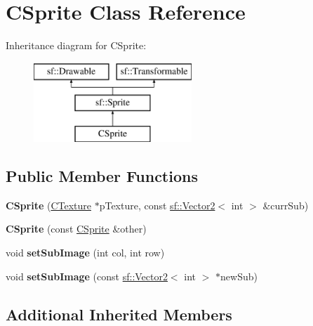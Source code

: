 \hypertarget{classCSprite}{\section{C\-Sprite Class Reference}
\label{classCSprite}
}
Inheritance diagram for C\-Sprite\-:\begin{figure}[H]
\begin{center}
\leavevmode
\includegraphics[height=3.000000cm]{classCSprite}
\end{center}
\end{figure}
\subsection*{Public Member Functions}
\begin{DoxyCompactItemize}
\item 
\hypertarget{classCSprite_afdfe7ac25b872dbafd60e6329185b0c5}{{\bfseries C\-Sprite} (\hyperlink{classCTexture}{C\-Texture} $\ast$p\-Texture, const \hyperlink{classsf_1_1Vector2}{sf\-::\-Vector2}$<$ int $>$ \&curr\-Sub)}\label{classCSprite_afdfe7ac25b872dbafd60e6329185b0c5}

\item 
\hypertarget{classCSprite_a7fa10fe45cf1683163671b7483ffc758}{{\bfseries C\-Sprite} (const \hyperlink{classCSprite}{C\-Sprite} \&other)}\label{classCSprite_a7fa10fe45cf1683163671b7483ffc758}

\item 
\hypertarget{classCSprite_a2162a3b87f87eecf9e9b93fe4c573690}{void {\bfseries set\-Sub\-Image} (int col, int row)}\label{classCSprite_a2162a3b87f87eecf9e9b93fe4c573690}

\item 
\hypertarget{classCSprite_a6e46dd766754438ebdefadf3449540da}{void {\bfseries set\-Sub\-Image} (const \hyperlink{classsf_1_1Vector2}{sf\-::\-Vector2}$<$ int $>$ $\ast$new\-Sub)}\label{classCSprite_a6e46dd766754438ebdefadf3449540da}

\end{DoxyCompactItemize}
\subsection*{Additional Inherited Members}


